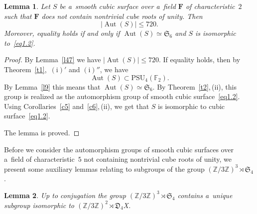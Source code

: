\documentclass{amsart}
\numberwithin{equation}{section}
\theoremstyle{plain}
\newtheorem{lemma}{Lemma}
\theoremstyle{definition}
\theoremstyle{remark}
\begin{document}
\begin{lemma}
\label{l49}
Let $S$ be a~smooth cubic surface over a~field $\mathbf{F}$ of characteristic~$2$ such that $\mathbf{F}$ does not contain nontrivial cube roots of unity. Then
$$
|{\operatorname{Aut}(S)}| \leqslant 720.
$$
Moreover, equality holds if and only if $\operatorname{Aut}(S) \simeq \mathfrak{S}_6$ and $S$ is isomorphic to~\eqref{eq1.2}.
\end{lemma}

\begin{proof}
By Lemma~\ref{l47} we have $|{\operatorname{Aut}(S)}| \leqslant 720$. If equality holds, then by Theorem~\ref{t1},~$(\mathrm{i})'$ and $(\mathrm{i})''$, we have
$$
\operatorname{Aut}(S) \subset \mathrm{PSU}_4(\mathbb{F}_2).
$$
By Lemma~\ref{l9} this means that $\operatorname{Aut}(S) \simeq \mathfrak{S}_6$. By Theorem~\ref{t2},\,(ii), this group is realized as the automorphism group of smooth cubic surface~\eqref{eq1.2}. Using Corollaries~\ref{c5} and~\ref{c6},\,(ii), we get that $S$ is isomorphic to cubic surface~\eqref{eq1.2}.

The lemma is proved.
\end{proof}

Before we consider the automorphism groups of smooth cubic surfaces over a~field of characteristic~$5$ not containing nontrivial cube roots of unity, we present some auxiliary lemmas relating to subgroups of the group $(\mathbb{Z}/3\mathbb{Z})^3 \rtimes \mathfrak{S}_4$.

\begin{lemma}
\label{l50}
Up to conjugation the group $(\mathbb{Z}/3\mathbb{Z})^3 \rtimes \mathfrak{S}_4$ contains a~unique subgroup isomorphic to $(\mathbb{Z}/3\mathbb{Z})^2 \rtimes \mathfrak{D}_4$X.
\end{lemma}
\end{document}
